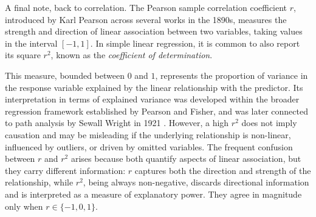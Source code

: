 \medskip

A final note, back to correlation. The Pearson sample correlation coefficient $r$, introduced by Karl Pearson across several works in the 1890s, measures the strength and direction of linear association between two variables, taking values in the  interval $[-1,1]$. In simple linear regression, it is common to also report its square $r^2$, known as the \textit{coefficient of determination}.

\medskip

This measure, bounded between \(0\) and \(1\), represents the proportion of variance  in the response variable explained by the linear relationship with the predictor. Its interpretation in terms of explained variance was developed within the broader regression framework established by Pearson and Fisher, and was later connected to path analysis by Sewall Wright in 1921 \cite{wright_1921_correlation}. However, a high $r^2$ does not imply causation and may be misleading if the underlying relationship is non-linear, influenced by outliers, or driven by omitted variables. The frequent confusion between $r$ and $r^2$ arises because both quantify aspects of linear association, but they carry different information: $r$ captures both the direction and strength of the relationship, while $r^2$, being always non-negative, discards directional information and is interpreted as a measure of explanatory power. They agree in magnitude only when $r \in \{-1, 0, 1\}$.
